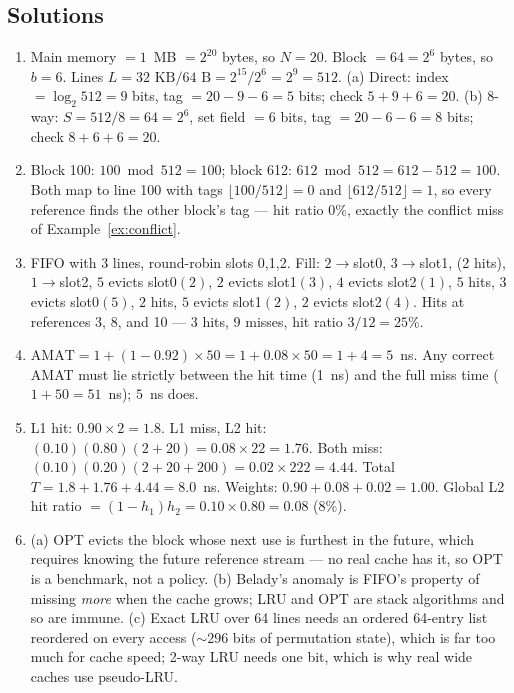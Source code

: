 \documentclass[11pt]{article}
\begin{document}
\subsection*{Solutions}
\begingroup\small
\begin{enumerate}
  \item Main memory $=1$~MB $=2^{20}$ bytes, so $N=20$. Block $=64=2^6$ bytes, so $b=6$. Lines $L = 32\text{ KB}/64\text{ B} = 2^{15}/2^{6}=2^{9}=512$. (a) Direct: index $=\log_2 512=9$ bits, tag $=20-9-6=5$ bits; check $5+9+6=20$. (b) 8-way: $S=512/8=64=2^6$, set field $=6$ bits, tag $=20-6-6=8$ bits; check $8+6+6=20$.
  \item Block 100: $100 \bmod 512 = 100$; block 612: $612 \bmod 512 = 612-512=100$. Both map to line 100 with tags $\lfloor 100/512\rfloor=0$ and $\lfloor 612/512\rfloor=1$, so every reference finds the other block's tag --- hit ratio $0\%$, exactly the conflict miss of Example~\ref{ex:conflict}.
  \item FIFO with 3 lines, round-robin slots 0,1,2. Fill: $2\to$slot0, $3\to$slot1, (2 hits), $1\to$slot2, $5$ evicts slot0$(2)$, $2$ evicts slot1$(3)$, $4$ evicts slot2$(1)$, $5$ hits, $3$ evicts slot0$(5)$, $2$ hits, $5$ evicts slot1$(2)$, $2$ evicts slot2$(4)$. Hits at references 3, 8, and 10 --- 3 hits, 9 misses, hit ratio $3/12=25\%$.
  \item $\text{AMAT} = 1 + (1-0.92)\times 50 = 1 + 0.08\times 50 = 1 + 4 = 5$~ns. Any correct AMAT must lie strictly between the hit time (1~ns) and the full miss time ($1+50=51$~ns); $5$~ns does.
  \item L1 hit: $0.90\times2=1.8$. L1 miss, L2 hit: $(0.10)(0.80)(2+20)=0.08\times22=1.76$. Both miss: $(0.10)(0.20)(2+20+200)=0.02\times222=4.44$. Total $T=1.8+1.76+4.44=8.0$~ns. Weights: $0.90+0.08+0.02=1.00$. Global L2 hit ratio $=(1-h_1)h_2=0.10\times0.80=0.08$ (8\%).
  \item (a) OPT evicts the block whose next use is furthest in the future, which requires knowing the future reference stream --- no real cache has it, so OPT is a benchmark, not a policy. (b) Belady's anomaly is FIFO's property of missing \emph{more} when the cache grows; LRU and OPT are stack algorithms and so are immune. (c) Exact LRU over 64 lines needs an ordered 64-entry list reordered on every access ($\sim296$ bits of permutation state), which is far too much for cache speed; 2-way LRU needs one bit, which is why real wide caches use pseudo-LRU.
\end{enumerate}
\endgroup



\end{document}
